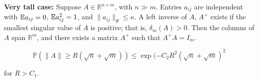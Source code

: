 \textbf{Very tall case:} Suppose \(A \in \mathbb{R}^{n \times m}\), with \(n \gg m\). Entries \(a_{ij}\) are independent with \(\mathbb{E} a_{ij} = 0\), \(\mathbb{E} a_{ij}^2 = 1\), and \(\lVert a_{ij} \rVert_\Psi \leq \kappa\). A left inverse of \(A\), \(A^+\) exists if the smallest singular value of \(A\) is positive; that is, \(\delta_m(A) > 0\). Then the columns of \(A\) span \(\mathbb{R}^m\), and there exists a matrix \(A^+\) such that \(A^+A = I_m\).

\begin{proposition}

\[
\mathbb{P} \left (\lVert A \rVert \geq R(\sqrt{n} + \sqrt{m}) \right) \leq \exp(- C_2 R^2(\sqrt{n} + \sqrt{m})^2
\]

for \(R > C_1\).

\end{proposition}

